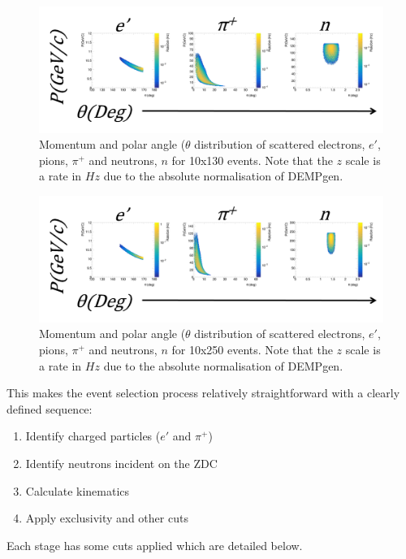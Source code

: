 \documentclass[letterpaper,12pt]{article}
\begin{document}
\begin{figure}[h]
    \centering
    \includegraphics[width=\textwidth]{Figures/10on130_PiDEMP_Truth.png}
    \caption{Momentum and polar angle ($\theta$ distribution of scattered electrons, $e'$, pions, $\pi^{+}$ and neutrons, $n$ for 10x130 events. Note that the $z$ scale is a rate in $Hz$ due to the absolute normalisation of DEMPgen.}
\label{fig:10x130_TruthKin}
\end{figure}
\begin{figure}[h]
    \centering
    \includegraphics[width=\textwidth]{Figures/10on250_PiDEMP_Truth.png}
    \caption{Momentum and polar angle ($\theta$ distribution of scattered electrons, $e'$, pions, $\pi^{+}$ and neutrons, $n$ for 10x250 events. Note that the $z$ scale is a rate in $Hz$ due to the absolute normalisation of DEMPgen.}
\label{fig:10x250_TruthKin}
\end{figure}

This makes the event selection process relatively straightforward with a clearly defined sequence:

\begin{enumerate}
    \item Identify charged particles ($e'$ and $\pi^{+}$)
    \item Identify neutrons incident on the ZDC
    \item Calculate kinematics
    \item Apply exclusivity and other cuts
\end{enumerate}

Each stage has some cuts applied which are detailed below.
\end{document}

